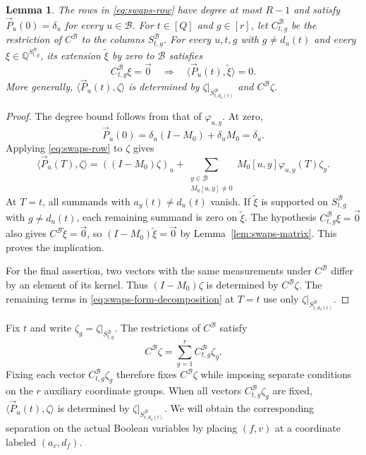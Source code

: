 \documentclass[11pt,reqno]{amsart}
\numberwithin{equation}{section}
\newtheorem{lemma}[theorem]{Lemma}
\theoremstyle{definition}\newtheorem{definition}[theorem]{Definition}
\theoremstyle{remark}\newtheorem{remark}[theorem]{Remark}
\begin{document}
\begin{lemma}\label{lem:swaps-forms}
The rows in \eqref{eq:swaps-row} have degree at most $R-1$ and satisfy
$\vec{P}_u(0)=\delta_u$ for every $u\in\mathcal B$. For $t\in[Q]$ and
$g\in[r]$, let $C^{\mathcal B}_{t,g}$ be the restriction of
$C^{\mathcal B}$ to the columns $S^{\mathcal B}_{t,g}$. For every
$u,t,g$ with $g\ne d_u(t)$ and every
$\xi\in\mathbb Q^{S^{\mathcal B}_{t,g}}$, its extension
$\widetilde\xi$ by zero to $\mathcal B$ satisfies
\[
 C^{\mathcal B}_{t,g}\xi=\vec{0}
 \quad\Longrightarrow\quad \langle \vec{P}_u(t), \widetilde\xi\rangle=0.
\]
More generally, $\langle \vec{P}_u(t), \zeta\rangle$ is determined by
$\zeta|_{S^{\mathcal B}_{t,d_u(t)}}$ and $C^{\mathcal B}\zeta$.
\end{lemma}
\begin{proof}
The degree bound follows from that of $\varphi_{u,y}$. At zero,
\[
 \vec{P}_u(0)=\delta_u(I-M_0)+\delta_uM_0=\delta_u.
\]
Applying \eqref{eq:swaps-row} to $\zeta$ gives
\begin{equation}\label{eq:swaps-form-decomposition}
 \langle \vec{P}_u(T), \zeta\rangle=((I-M_0)\zeta)_u+
 \sum_{\substack{y\in\mathcal B\\M_0[u,y]\ne0}}
 M_0[u,y]\varphi_{u,y}(T)\zeta_y.
\end{equation}
At $T=t$, all summands with $a_y(t)\ne d_u(t)$ vanish. If
$\widetilde\xi$ is supported on $S^{\mathcal B}_{t,g}$ with
$g\ne d_u(t)$, each remaining summand is zero on $\widetilde\xi$.
The hypothesis $C^{\mathcal B}_{t,g}\xi=\vec{0}$ also gives
$C^{\mathcal B}\widetilde\xi=\vec{0}$, so
$(I-M_0)\widetilde\xi=\vec{0}$ by Lemma~\ref{lem:swaps-matrix}.
This proves the implication.

For the final assertion, two vectors with the same measurements under
$C^{\mathcal B}$ differ by an element of its kernel. Thus
$(I-M_0)\zeta$ is determined by $C^{\mathcal B}\zeta$. The remaining
terms in \eqref{eq:swaps-form-decomposition} at $T=t$ use only
$\zeta|_{S^{\mathcal B}_{t,d_u(t)}}$.
\end{proof}

Fix $t$ and write $\zeta_g=\zeta|_{S^{\mathcal B}_{t,g}}$. The
restrictions of $C^{\mathcal B}$ satisfy
\begin{equation}\label{eq:auxiliary-measurements}
 C^{\mathcal B}\zeta=\sum_{g=1}^r C^{\mathcal B}_{t,g}\zeta_g.
\end{equation}
Fixing each vector $C^{\mathcal B}_{t,g}\zeta_g$ therefore fixes
$C^{\mathcal B}\zeta$ while imposing separate conditions on the
$r$ auxiliary coordinate groups. When all vectors
$C^{\mathcal B}_{t,g}\zeta_g$ are fixed, $\langle \vec{P}_u(t), \zeta\rangle$ is determined
by $\zeta|_{S^{\mathcal B}_{t,d_u(t)}}$.
We will obtain the corresponding separation on the actual Boolean
variables by placing $(f,v)$ at a coordinate labeled $(a_v,d_f)$.
\end{document}
